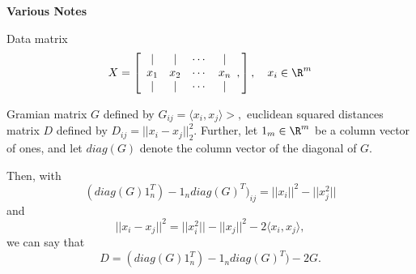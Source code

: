 \documentclass[11pt]{article}
\begin{document}
\setlength{\parindent}{0pt}
\setlength{\parskip}{0.4cm}

\singlespacing

\begin{center} {\bf Various Notes } \end{center}

Data matrix
\[X = \left[\begin{array}{cccc}
		\vert & \vert & \cdots & \vert \\
		x_1 & x_2 & \cdots & x_n \\
		\vert & \vert & \cdots & \vert \\
	\end{array},
		\right],
\quad x_i \in \R^m
\]

Gramian matrix $G$ defined by $G_{ij} = \langle x_i, x_j \rangle>,$ euclidean
squared distances matrix $D$ defined by $D_{ij} = ||x_i - x_j||_2^{2}.$
Further, let $1_m \in \R^m$ be a column vector of ones, and let $diag(G)$
denote the column vector of the diagonal of $G.$

Then, with
\[ (diag(G) 1_n^T) - 1_n diag(G)^T)_{ij} =  ||x_i||^2 - ||x_j^2||\] and 
\[||x_i - x_j||^2 = ||x_i^2|| - ||x_j||^2 - 2\langle x_i,x_j \rangle,\]
we can say that 
\[D = (diag(G) 1_n^T) - 1_n diag(G)^T) - 2G.\]
\end{document}
